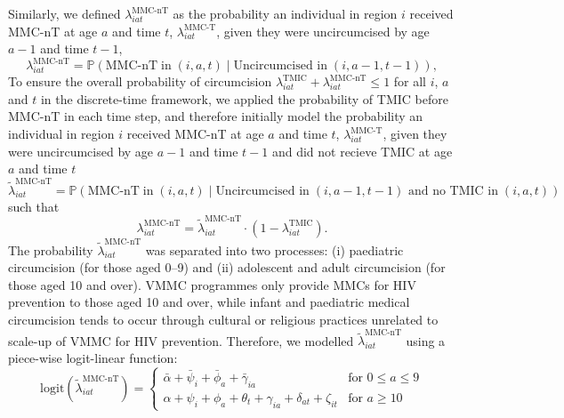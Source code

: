 \documentclass{article}
\begin{document}
\begin{appendix}
\noindent Similarly, we defined $\lambda^{\text{MMC-nT}}_{iat}$ as the probability an individual in region $i$ received MMC-nT at age $a$ and time $t$, $\lambda^{\text{MMC-T}}_{iat}$, given they were uncircumcised by age $a-1$ and time $t-1$,  
\begin{equation}
		\lambda^{\text{MMC-nT}}_{iat} = \mathbb{P}(\text{MMC-nT} \; \text{in} \; (i,a,t) \; | \; \text{Uncircumcised in} \; (i,a-1, t-1)),
	\label{eqn::mmc}
\end{equation}
To ensure the overall probability of circumcision $\lambda^{\text{TMIC}}_{iat} + \lambda^{\text{MMC-nT}}_{iat} \leq 1$ for all $i$, $a$ and $t$ in the discrete-time framework, we applied the probability of TMIC  before MMC-nT in each time step, and therefore initially model the probability an individual in region $i$ received MMC-nT at age $a$ and time $t$, $\lambda^{\text{MMC-T}}_{iat}$, given they were uncircumcised by age $a-1$ and time $t-1$ and did not recieve TMIC at age $a$ and time $t$
\begin{equation*}
		\tilde{\lambda}^{\text{MMC-nT}}_{iat} = \mathbb{P}(\text{MMC-nT} \; \text{in} \; (i,a,t) \; | \; \text{Uncircumcised in} \; (i,a-1, t-1) \text{ and no TMIC in} \; (i,a, t))
\end{equation*}
such that
\begin{equation*}
		\lambda^{\text{MMC-nT}}_{iat} = \tilde{\lambda}^{\text{MMC-nT}}_{iat}\cdot (1-\lambda^{\text{TMIC}}_{iat}).
\end{equation*}
The probability $\tilde{\lambda}^{\text{MMC-nT}}_{iat}$ was separated into two processes: (i) paediatric circumcision (for those aged 0--9) and (ii) adolescent and adult circumcision (for those aged 10 and over). VMMC programmes only provide MMCs for HIV prevention to those aged 10 and over, while infant and paediatric medical circumcision tends to occur through cultural or religious practices unrelated to scale-up of VMMC for HIV prevention. Therefore, we modelled $\tilde{\lambda}^{\text{MMC-nT}}_{iat}$ using a piece-wise logit-linear function:
\begin{equation*}
	\text{logit}(\tilde{\lambda}^{\text{MMC-nT}}_{iat}) =
	\begin{cases}
		\bar{\alpha} + \bar{\psi}_i + \bar{\phi}_a + \bar{\gamma}_{ia} & \text{for } 0 \leq a \leq 9\\
		\alpha + \psi_i + \phi_a + \theta_t + \gamma_{ia} + \delta_{at} + \zeta_{it} & \text{for } a \geq 10
	\end{cases} 
\end{equation*}

\end{appendix}
\end{document}
